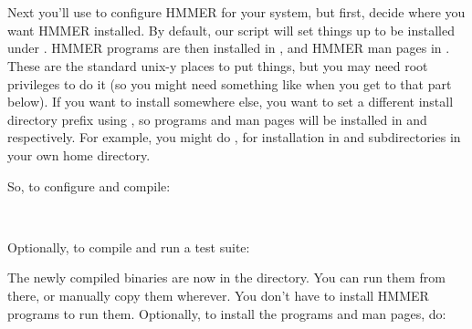   \vspace{1ex}
  \\
  \\
  \vspace{1ex}

Next you'll use  to configure HMMER for your system,
but first, decide where you want HMMER installed. By default, our
 script will set things up to be installed under
. HMMER programs are then installed in
, and HMMER man pages in
.  These are the standard unix-y
places to put things, but you may need root privileges to do it (so
you might need something like  when you get to
that part below). If you want to install somewhere else, you want to
set a different install directory prefix using , so programs and man pages will be
installed in  and
 respectively.  For
example, you might do , for
installation in  and
 subdirectories in your own home
directory.

So, to configure and compile:


  \vspace{1ex} 
  \\
  \vspace{1ex} 

Optionally, to compile and run a test suite:

  \vspace{1ex}
  \vspace{1ex}

The newly compiled binaries are now in the  directory.  You
can run them from there, or manually copy them wherever.  You don't
have to install HMMER programs to run them. Optionally, to install the
programs and man pages, do:

